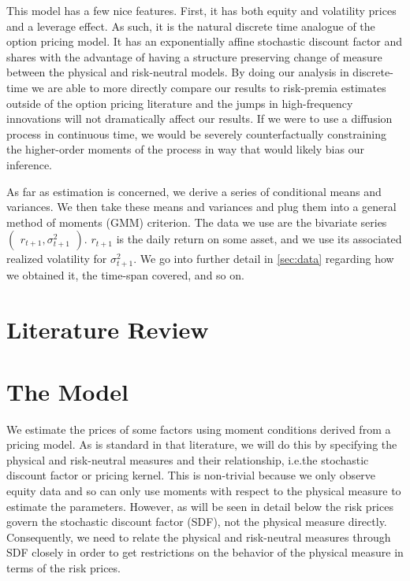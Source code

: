 \documentclass[11pt, letterpaper, twoside, final]{article}
\begin{document}
This model has a few nice features. 
First, it has both equity and volatility prices and a leverage effect. 
As such, it is the natural discrete time analogue of the \textcite{heston1993closedform} option pricing model. 
It has an exponentially affine stochastic discount factor  and shares with \textcite{heston1993closedform} the
advantage of having a structure preserving change of measure between the physical and risk-neutral models.
By doing our analysis in discrete-time we are able to more directly compare our results to risk-premia estimates
outside of the option pricing literature and the jumps in high-frequency innovations will not dramatically affect
our results.  
If we were to use a diffusion process in continuous time, we would be severely counterfactually constraining the
higher-order  moments of the process in way that would likely bias our inference. 

As far as estimation is concerned, we derive a series of conditional means and variances.
We then take these means and variances and plug them into a general method of moments (GMM) criterion.
The data we use are the bivariate series $\begin{pmatrix} r_{t+1}, \sigma^2_{t+1} \end{pmatrix}$.
$r_{t+1}$ is the daily return on some asset, and we use its associated realized volatility for $\sigma^2_{t+1}$.
We go into further detail in \cref{sec:data} regarding how we obtained it, the time-span covered, and so on.

\section{Literature Review}\label{sec:lit_review}


\section{The Model}\label{sec:model}

\addtocounter{subsection}{1}

We estimate the prices of some factors using moment conditions derived from a pricing model. 
As is standard in that literature, we will do  this by specifying the physical and risk-neutral measures and their
relationship, i.e.\@ the stochastic discount factor or pricing kernel.
This is non-trivial because we only observe equity data and so can only use moments with respect to the physical
measure to estimate the parameters. 
However, as will be seen in detail below the risk prices govern the stochastic discount factor (SDF), not the
physical measure directly. 
Consequently, we need to relate the physical and risk-neutral measures through SDF closely in order to get
restrictions on the behavior of the physical measure in terms of the risk prices. 
\end{document}
